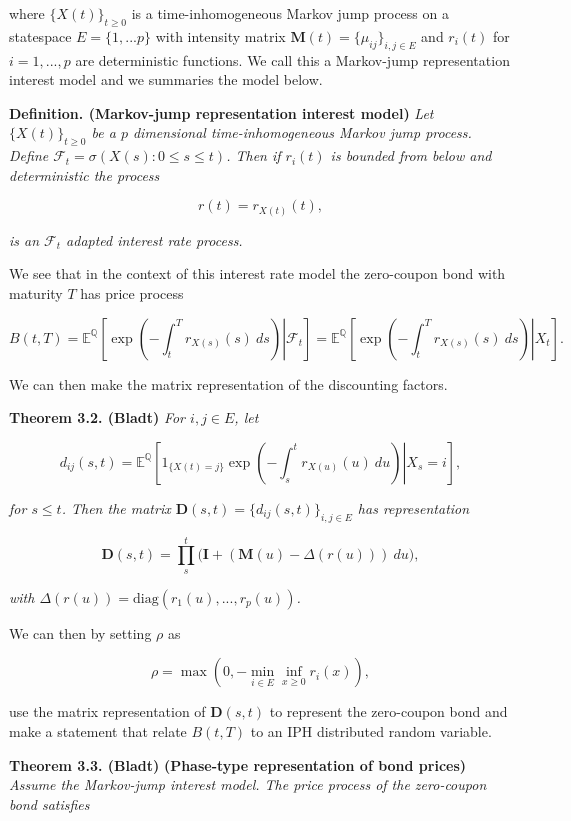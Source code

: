 \documentclass[
]{book}
\begin{document}
where \(\{X(t)\}_{t\ge 0}\) is a time-inhomogeneous Markov jump process on a statespace \(E=\{1,...p\}\) with intensity matrix \(\mathbf M(t)=\{\mu_{ij}\}_{i,j\in E}\) and \(r_i(t)\) for \(i=1,...,p\) are deterministic functions. We call this a Markov-jump representation interest model and we summaries the model below.

\textbf{Definition. (Markov-jump representation interest model)} \emph{Let \(\{X(t)\}_{t\ge 0}\) be a \(p\) dimensional time-inhomogeneous Markov jump process. Define \(\mathcal F_t=\sigma(X(s) : 0\le s\le t)\). Then if \(r_i(t)\) is bounded from below and deterministic the process}

\[
r(t)=r_{X(t)}(t),
\]

\emph{is an \(\mathcal F_t\) adapted interest rate process.}

We see that in the context of this interest rate model the zero-coupon bond with maturity \(T\) has price process

\[
B(t,T)=\mathbb E^{\mathbb Q}\left[\left.\exp\left(-\int_t^Tr_{X(s)}(s)\ ds\right) \right\vert \mathcal F_t\right]=\mathbb E^{\mathbb Q}\left[\left.\exp\left(-\int_t^Tr_{X(s)}(s)\ ds\right) \right\vert X_t\right].
\]

We can then make the matrix representation of the discounting factors.

\textbf{Theorem 3.2. (Bladt)} \emph{For \(i,j\in E\), let}

\[
d_{ij}(s,t)=\mathbb E^{\mathbb Q}\left[\left.1_{\{X(t)=j\}}\exp\left(-\int_s^tr_{X(u)}(u)\ du\right) \right\vert X_s=i\right],
\]

\emph{for \(s\le t\). Then the matrix \(\mathbf D(s,t)=\{d_{ij}(s,t)\}_{i,j\in E}\) has representation}

\[
\mathbf D(s,t)=\prod_s^t\Big(\mathbf I+(\mathbf M(u)-\Delta (r(u)))\ du\Big),
\]

\emph{with \(\Delta(r(u))=\text{diag}(r_1(u),...,r_p(u))\).}

We can then by setting \(\rho\) as

\[
\rho=\max\left(0,-\min_{i\in E}\inf_{x\ge 0}r_i(x)\right),
\]

use the matrix representation of \(\mathbf D(s,t)\) to represent the zero-coupon bond and make a statement that relate \(B(t,T)\) to an IPH distributed random variable.

\textbf{Theorem 3.3. (Bladt)} \textbf{(Phase-type representation of bond prices)} \emph{Assume the Markov-jump interest model. The price process of the zero-coupon bond satisfies}
\end{document}
